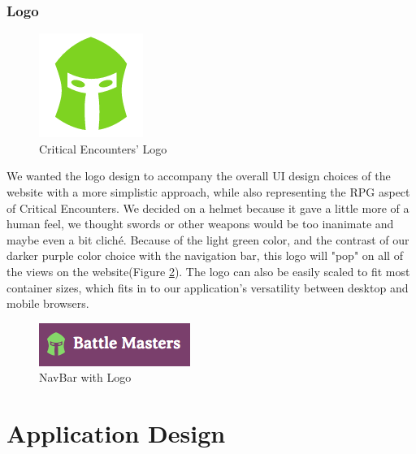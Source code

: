 \documentclass[12pt,a4paper]{report}
\begin{document}
	\subsection {Logo}
	\begin{figure}[H]
		\centering
		\includegraphics[scale=.5]{logo-large}
		\caption{Critical Encounters' Logo}
		\label{fig: Critical Encounters' Logo}
	\end{figure}
	We wanted the logo design to accompany the overall UI design choices of the website with a more simplistic approach, while also representing the RPG aspect of Critical Encounters. We decided on a helmet because it gave a little more of a human feel, we thought swords or other weapons would be too inanimate and maybe even a bit cliché. Because of the light green color, and the contrast of our darker purple color choice with the navigation bar, this logo will "pop" on all of the views on the website(Figure \ref{fig: NavBar with Logo}). The logo can also be easily scaled to fit most container sizes, which fits in to our application's versatility between desktop and mobile browsers.
	\bigskip
	\begin{figure}[H]
		\centering
		\centerline{\includegraphics[scale=1]{navbar-logo}}
		\caption{NavBar with Logo}
		\label{fig: NavBar with Logo}
	\end{figure}

	
	\newpage
	\chapter*{Application Design}
\end{document}
